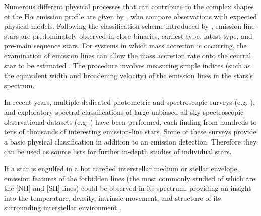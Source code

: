 Numerous different physical processes that can contribute to the complex shapes of the H$\alpha$ emission profile are given by \citet{1996A&AS..120..229R, 2011AJ....141..150J, 2014ApJ...795...82S, 2018AJ....156...97I}, who compare observations with expected physical models. Following the classification scheme introduced by \citet{2007ASSL..342.....K}, emission-line stars are predominately observed in close binaries, earliest-type, latest-type, and pre-main sequence stars. For systems in which mass accretion is occurring, the examination of emission lines can allow the mass accretion rate onto the central star to be estimated \cite{2003ApJ...582.1109W, 2004A&A...424..603N}. The procedure involves measuring simple indices (such as the equivalent width and broadening velocity) of the emission lines in the stars's spectrum.

In recent years, multiple dedicated photometric and spectroscopic surveys (e.g. \cite{2008MNRAS.384.1277W, 2008MNRAS.388.1879M, 2012ApJS..200...14M, 2012AJ....143...61N, 2014MNRAS.440.2036D, 2016MNRAS.456.1424A, 2016ASPC..505...66N}), and exploratory spectral classifications of large unbiased all-sky spectroscopic observational datasets (e.g. \cite{1999A&AS..134..255K, 2012MNRAS.425..355R, 2015A&A...581A..52T, 2016ASPC..505...66N, 2016RAA....16..138H, 2017ApJS..228...24T}) have been performed, each finding from hundreds to tens of thousands of interesting emission-line stars. Some of these surveys provide a basic physical classification in addition to an emission detection. Therefore they can be used as source lists for further in-depth studies of individual stars.

If a star is engulfed in a hot rarefied interstellar medium or stellar envelope, emission features of the forbidden lines (the most commonly studied of which are the [NII] and [SII] lines) could be observed in its spectrum, providing an insight into the temperature, density, intrinsic movement, and structure of its surrounding interstellar environment \cite{1973ApJ...184...93B, 1993Ap&SS.204..205R, 2005MNRAS.361..813E, 2016A&A...591A..74D, 2017A&A...604A.135D}.


